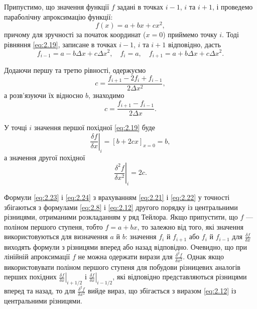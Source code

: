 Припустимо, що значення функції $f$ задані в точках $i - 1$, $i$ та $i + 1$, і проведемо параболічну апроксимацію функції:
\begin{equation}
    \label{eq:2.19}
    f(x) = a + b x + c x^2,
\end{equation}
причому для зручності за початок координат ($x = 0$) приймемо точку $i$. Тоді рівняння \eqref{eq:2.19}, записане в точках $i - 1$, $i$ та $i + 1$ відповідно, дасть
\begin{equation}
    \label{eq:2.20}
    f_{i - 1} = a - b \Delta x + c \Delta x^2, \quad f_i = a, \quad f_{i + 1} = a + b \Delta x + c \Delta x^2. 
\end{equation}

Додаючи першу та третю рівності, одержуємо
\begin{equation}
    \label{eq:2.21}
    c = \frac{f_{i + 1} - 2 f_i + f_{i - 1}}{2 \Delta x^2}, 
\end{equation}
а розв'язуючи їх відносно $b$, знаходимо
\begin{equation}
    \label{eq:2.22}
    c = \frac{f_{i + 1} - f_{i - 1}}{2 \Delta x}.
\end{equation}

У точці $i$ значення першої похідної \eqref{eq:2.19} буде
\begin{equation}
    \label{eq:2.23}
    \left. \frac{\delta f}{\delta x} \right|_i = [b + 2 c x]_{x = 0} = b,
\end{equation}
а значення другої похідної
\begin{equation}
    \label{eq:2.24}
    \left. \frac{\delta^2 f}{\delta x^2} \right|_i = 2 c.
\end{equation}

Формули \eqref{eq:2.23} і \eqref{eq:2.24} з врахуванням \eqref{eq:2.21} і \eqref{eq:2.22} у точності збігаються з формулами \eqref{eq:2.8} і \eqref{eq:2.12} другого порядку із центральними різницями, отриманими розкладанням у ряд Тейлора. Якщо припустити, що $f$ --- поліном першого ступеня, тобто $f = a + bx$, то залежно від того, які значення використовуються для визначення $a$ й $b$: значення $f_i$ й $f_{i + 1}$ або $f_i$ й $f_{i - 1}$ для $\frac{\delta f}{\delta x}$ виходять формули з різницями вперед або назад відповідно. Очевидно, що при лінійній апроксимації $f$ не можна одержати вирази для $\frac{\delta^2 f}{\delta x^2}$. Однак якщо використовувати поліном першого ступеня для побудови різницевих аналогів перших похідних $\left. \frac{\delta f}{\delta x} \right|_{i + 1/2}$ і $\left. \frac{\delta f}{\delta x} \right|_{i - 1/2}$, які відповідно представляються різницями вперед та назад, то для $\frac{\delta^2 f}{\delta x^2}$ вийде вираз, що збігається з виразом \eqref{eq:2.12} із центральними різницями. \medskip

